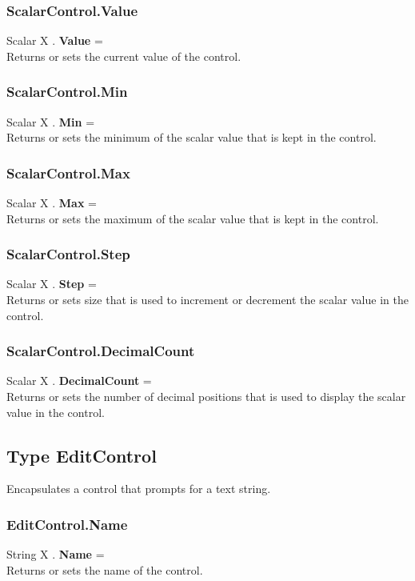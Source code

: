 \documentclass[10pt]{book}
\begin{document}
\subsubsection{ScalarControl.Value \label{F:ScalarControl:Value}}
Scalar X . \textbf{Value} = \\
Returns or sets the current value of the control.

\subsubsection{ScalarControl.Min \label{F:ScalarControl:Min}}
Scalar X . \textbf{Min} = \\
Returns or sets the minimum of the scalar value that is kept in the control.

\subsubsection{ScalarControl.Max \label{F:ScalarControl:Max}}
Scalar X . \textbf{Max} = \\
Returns or sets the maximum of the scalar value that is kept in the control.

\subsubsection{ScalarControl.Step \label{F:ScalarControl:Step}}
Scalar X . \textbf{Step} = \\
Returns or sets size that is used to increment or decrement the scalar value in the control.

\subsubsection{ScalarControl.DecimalCount \label{F:ScalarControl:DecimalCount}}
Scalar X . \textbf{DecimalCount} = \\
Returns or sets the number of decimal positions that is used to display the scalar value in the control.

\subsection{Type EditControl \label{T:EditControl}}
Encapsulates a control that prompts for a text string.

\subsubsection{EditControl.Name \label{F:EditControl:Name}}
String X . \textbf{Name} = \\
Returns or sets the name of the control.
\end{document}
